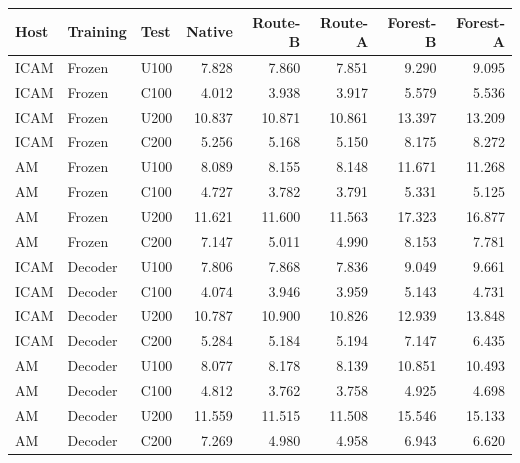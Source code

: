 \begin{tabular}{lllrrrrr}
\toprule
Host & Training & Test & Native & Route-B & Route-A & Forest-B & Forest-A \\
\midrule
ICAM & Frozen & U100 & 7.828 & 7.860 & 7.851 & 9.290 & 9.095 \\
ICAM & Frozen & C100 & 4.012 & 3.938 & 3.917 & 5.579 & 5.536 \\
ICAM & Frozen & U200 & 10.837 & 10.871 & 10.861 & 13.397 & 13.209 \\
ICAM & Frozen & C200 & 5.256 & 5.168 & 5.150 & 8.175 & 8.272 \\
\midrule
AM & Frozen & U100 & 8.089 & 8.155 & 8.148 & 11.671 & 11.268 \\
AM & Frozen & C100 & 4.727 & 3.782 & 3.791 & 5.331 & 5.125 \\
AM & Frozen & U200 & 11.621 & 11.600 & 11.563 & 17.323 & 16.877 \\
AM & Frozen & C200 & 7.147 & 5.011 & 4.990 & 8.153 & 7.781 \\
\midrule
ICAM & Decoder & U100 & 7.806 & 7.868 & 7.836 & 9.049 & 9.661 \\
ICAM & Decoder & C100 & 4.074 & 3.946 & 3.959 & 5.143 & 4.731 \\
ICAM & Decoder & U200 & 10.787 & 10.900 & 10.826 & 12.939 & 13.848 \\
ICAM & Decoder & C200 & 5.284 & 5.184 & 5.194 & 7.147 & 6.435 \\
\midrule
AM & Decoder & U100 & 8.077 & 8.178 & 8.139 & 10.851 & 10.493 \\
AM & Decoder & C100 & 4.812 & 3.762 & 3.758 & 4.925 & 4.698 \\
AM & Decoder & U200 & 11.559 & 11.515 & 11.508 & 15.546 & 15.133 \\
AM & Decoder & C200 & 7.269 & 4.980 & 4.958 & 6.943 & 6.620 \\
\bottomrule
\end{tabular}

